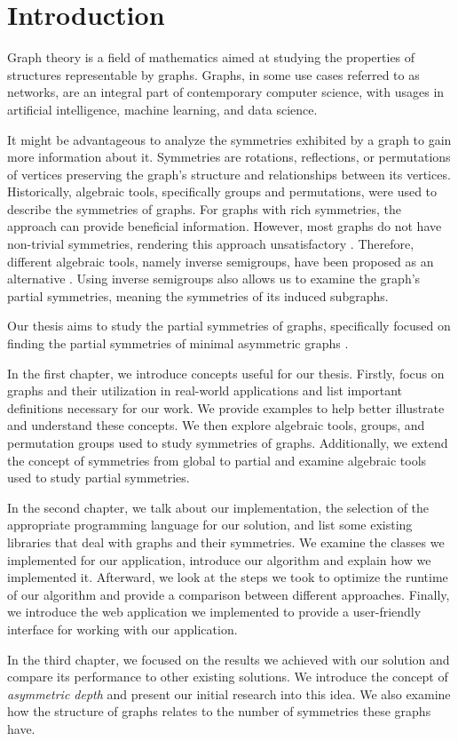 \chapter*{Introduction}\label{chap:intro}

Graph theory is a field of mathematics aimed at studying the properties of structures representable by graphs. Graphs, in some use cases referred to as networks, are an integral part of contemporary computer science, with usages in artificial intelligence, machine learning, and data science.

It might be advantageous to analyze the symmetries exhibited by a graph to gain more information about it. Symmetries are rotations, reflections, or permutations of vertices preserving the graph's structure and relationships between its vertices. Historically, algebraic tools, specifically groups and permutations, were used to describe the symmetries of graphs. For graphs with rich symmetries, the approach can provide beneficial information. However, most graphs do not have non-trivial symmetries, rendering this approach unsatisfactory \cite{er63}. Therefore, different algebraic tools, namely inverse semigroups, have been proposed as an alternative \cite{jjss21}. Using inverse semigroups also allows us to examine the graph's partial symmetries, meaning the symmetries of its induced subgraphs.

Our thesis aims to study the partial symmetries of graphs, specifically focused on finding the partial symmetries of minimal asymmetric graphs \cite{sch17}.

In the first chapter, we introduce concepts useful for our thesis. Firstly, focus on graphs and their utilization in real-world applications and list important definitions necessary for our work. We provide examples to help better illustrate and understand these concepts. We then explore algebraic tools, groups, and permutation groups used to study symmetries of graphs. Additionally, we extend the concept of symmetries from global to partial and examine algebraic tools used to study partial symmetries.

In the second chapter, we talk about our implementation, the selection of the appropriate programming language for our solution, and list some existing libraries that deal with graphs and their symmetries. We examine the classes we implemented for our application, introduce our algorithm and explain how we implemented it. Afterward, we look at the steps we took to optimize the runtime of our algorithm and provide a comparison between different approaches. Finally, we introduce the web application we implemented to provide a user-friendly interface for working with our application.

In the third chapter, we focused on the results we achieved with our solution and compare its performance to other existing solutions. We introduce the concept of \emph{asymmetric depth} and present our initial research into this idea. We also examine how the structure of graphs relates to the number of symmetries these graphs have.